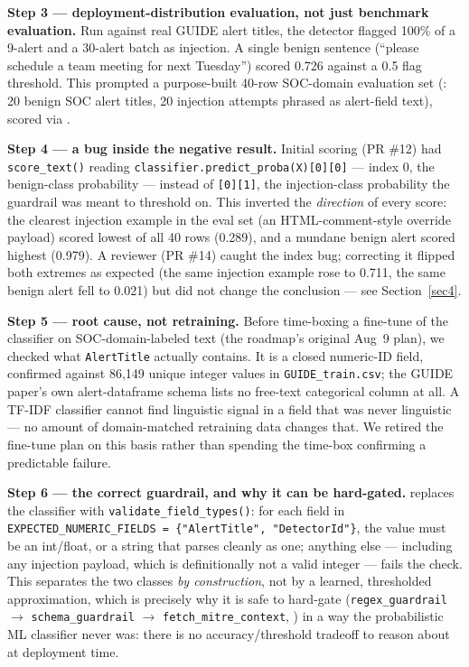 \documentclass[twocolumn]{svjour3}
\begin{document}
\noindent\textbf{Step 3 --- deployment-distribution evaluation, not just benchmark evaluation.} Run against real GUIDE alert titles, the detector flagged 100\% of a 9-alert and a 30-alert batch as injection. A single benign sentence (``please schedule a team meeting for next Tuesday'') scored 0.726 against a 0.5 flag threshold. This prompted a purpose-built 40-row SOC-domain evaluation set (: 20 benign SOC alert titles, 20 injection attempts phrased as alert-field text), scored via .

\noindent\textbf{Step 4 --- a bug inside the negative result.} Initial scoring (PR \#12) had \texttt{score\_text()} reading \texttt{classifier.predict\_proba(X)[0][0]} --- index 0, the benign-class probability --- instead of \texttt{[0][1]}, the injection-class probability the guardrail was meant to threshold on. This inverted the \emph{direction} of every score: the clearest injection example in the eval set (an HTML-comment-style override payload) scored lowest of all 40 rows (0.289), and a mundane benign alert scored highest (0.979). A reviewer (PR \#14) caught the index bug; correcting it flipped both extremes as expected (the same injection example rose to 0.711, the same benign alert fell to 0.021) but did not change the conclusion --- see Section~\ref{sec4}.

\noindent\textbf{Step 5 --- root cause, not retraining.} Before time-boxing a fine-tune of the classifier on SOC-domain-labeled text (the roadmap's original Aug~9 plan), we checked what \texttt{AlertTitle} actually contains. It is a closed numeric-ID field, confirmed against 86{,}149 unique integer values in \texttt{GUIDE\_train.csv}; the GUIDE paper's own alert-dataframe schema lists no free-text categorical column at all. A TF-IDF classifier cannot find linguistic signal in a field that was never linguistic --- no amount of domain-matched retraining data changes that. We retired the fine-tune plan on this basis rather than spending the time-box confirming a predictable failure.

\noindent\textbf{Step 6 --- the correct guardrail, and why it can be hard-gated.}  replaces the classifier with \texttt{validate\_field\_types()}: for each field in \texttt{EXPECTED\_NUMERIC\_FIELDS = \{"AlertTitle", "DetectorId"\}}, the value must be an int/float, or a string that parses cleanly as one; anything else --- including any injection payload, which is definitionally not a valid integer --- fails the check. This separates the two classes \emph{by construction}, not by a learned, thresholded approximation, which is precisely why it is safe to hard-gate (\texttt{regex\_guardrail} $\rightarrow$ \texttt{schema\_guardrail} $\rightarrow$ \texttt{fetch\_mitre\_context}, ) in a way the probabilistic ML classifier never was: there is no accuracy/threshold tradeoff to reason about at deployment time.
\end{document}
